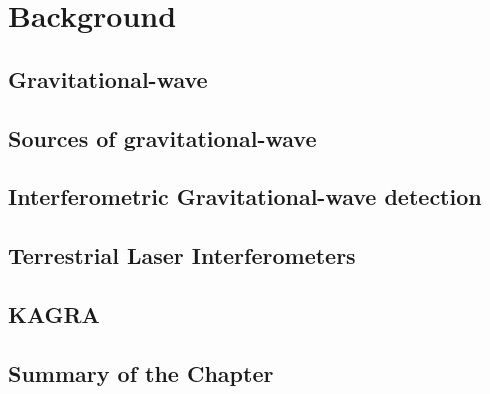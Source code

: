 \chapter{Background}
\section{Gravitational-wave}
\section{Sources of gravitational-wave}
\section{Interferometric Gravitational-wave detection}
\section{Terrestrial Laser Interferometers}
\section{KAGRA}
\section{Summary of the Chapter}
